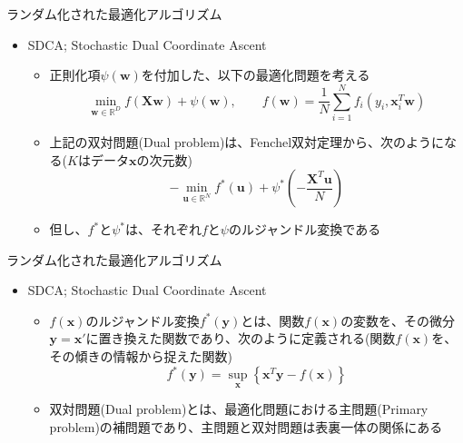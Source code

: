 \documentclass[dvipdfmx,notheorems,t]{beamer}
\begin{document}
\begin{frame}{ランダム化された最適化アルゴリズム}

\begin{itemize}
	\item SDCA; Stochastic Dual Coordinate Ascent
	\begin{itemize}
		\item 正則化項$\psi(\bm{w})$を付加した、以下の最適化問題を考える
		\begin{equation}
			\min_{\bm{w} \in \mathbb{R}^D} f(\bm{X} \bm{w}) + \psi(\bm{w}), \qquad f(\bm{w}) = \frac{1}{N} \sum_{i = 1}^N f_i(y_i, \bm{x}_i^T \bm{w})
		\end{equation}
		
		\item 上記の\alert{双対問題}(Dual problem)は、\alert{Fenchel双対定理}から、次のようになる($K$はデータ$\bm{x}$の次元数)~\cite{suzuki_2013}
		\begin{equation}
			- \min_{\bm{u} \in \mathbb{R}^N} f^*(\bm{u}) + \psi^* \left( -\frac{\bm{X}^T \bm{u}}{N} \right)
		\end{equation}
		
		\item 但し、$f^*$と$\psi^*$は、それぞれ$f$と$\psi$の\alert{ルジャンドル変換}である
	\end{itemize}
\end{itemize}

\end{frame}

\begin{frame}{ランダム化された最適化アルゴリズム}

\begin{itemize}
	\item SDCA; Stochastic Dual Coordinate Ascent
	\begin{itemize}
		\item $f(\bm{x})$の\alert{ルジャンドル変換}$f^*(\bm{y})$とは、関数$f(\bm{x})$の変数を、その微分$\bm{y} = \bm{x}'$に置き換えた関数であり、次のように定義される(関数$f(\bm{x})$を、その傾きの情報から捉えた関数)
		\begin{equation}
			f^*(\bm{y}) = \sup_{\bm{x}} \left\{ \bm{x}^T \bm{y} - f(\bm{x}) \right\}
		\end{equation}
		
		\item 双対問題(Dual problem)とは、最適化問題における\alert{主問題}(Primary problem)の\alert{補問題}であり、主問題と双対問題は表裏一体の関係にある
	\end{itemize}
\end{itemize}

\end{frame}
\end{document}
